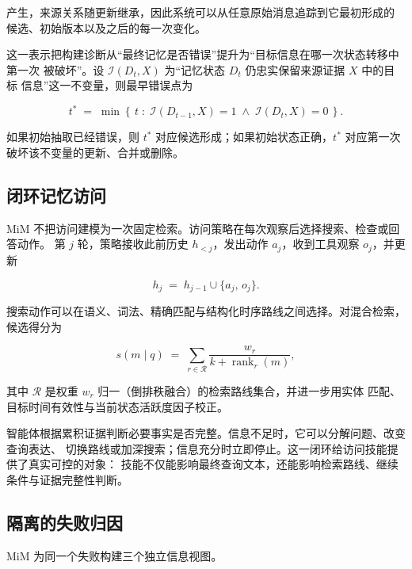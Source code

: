 \documentclass[UTF8,11pt]{ctexart}
\newcommand{\RR}{\mathcal{R}}
\DeclareMathOperator{\Rank}{rank}
\begin{document}
\noindent 产生，来源关系随更新继承，因此系统可以从任意原始消息追踪到它最初形成的
候选、初始版本以及之后的每一次变化。

这一表示把构建诊断从“最终记忆是否错误”提升为“目标信息在哪一次状态转移中第一次
被破坏”。设 $\mathcal{I}(D_t, X)$ 为“记忆状态 $D_t$ 仍忠实保留来源证据 $X$ 中的目标
信息”这一不变量，则最早错误点为

\begin{equation}
\label{eq:tstar}
t^{*} \;=\; \min\left\{\, t \;:\; \mathcal{I}(D_{t-1}, X) = 1 \;\land\; \mathcal{I}(D_t, X) = 0 \,\right\}.
\end{equation}

\noindent 如果初始抽取已经错误，则 $t^{*}$ 对应候选形成；如果初始状态正确，$t^{*}$
对应第一次破坏该不变量的更新、合并或删除。

\subsection{闭环记忆访问}
\label{sec:method-access}

MiM 不把访问建模为一次固定检索。访问策略在每次观察后选择搜索、检查或回答动作。
第 $j$ 轮，策略接收此前历史 $h_{<j}$，发出动作 $a_j$，收到工具观察 $o_j$，并更新

\begin{equation}
\label{eq:hist}
h_j \;=\; h_{j-1} \cup \{a_j,\,o_j\}.
\end{equation}

搜索动作可以在语义、词法、精确匹配与结构化时序路线之间选择。对混合检索，候选得分为

\begin{equation}
\label{eq:hybrid}
s(m \mid q) \;=\; \sum_{r \in \RR} \frac{w_r}{k + \Rank_r(m)},
\end{equation}

\noindent 其中 $\RR$ 是权重 $w_r$ 归一（倒排秩融合）的检索路线集合，并进一步用实体
匹配、目标时间有效性与当前状态活跃度因子校正。

智能体根据累积证据判断必要事实是否完整。信息不足时，它可以分解问题、改变查询表达、
切换路线或加深搜索；信息充分时立即停止。这一闭环给访问技能提供了真实可控的对象：
技能不仅能影响最终查询文本，还能影响检索路线、继续条件与证据完整性判断。

\subsection{隔离的失败归因}
\label{sec:method-attribution}

MiM 为同一个失败构建三个独立信息视图。
\end{document}
